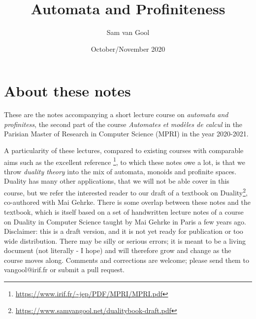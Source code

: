 
\title{Automata and Profiniteness}
\author{Sam van Gool}
\date{October/November 2020}
\maketitle

\section*{About these notes}
These are the notes accompanying a short lecture course on \emph{automata and profinitess}, the second part of the course \emph{Automates et mod\`eles de calcul} in the Parisian Master of Research in Computer Science (MPRI) in the year 2020-2021.


A particularity of these lectures, compared to existing courses with comparable aims such as the excellent reference \cite{JEP-MPRI}\footnote{\url{https://www.irif.fr/~jep/PDF/MPRI/MPRI.pdf}}, to which these notes owe a lot, is that we throw \emph{duality theory} into the mix of automata, monoids and profinite spaces. %
Duality has many other applications, that we will not be able cover in this course, but we refer the interested reader to our draft \cite{thebook} of a textbook on Duality\footnote{\url{https://www.samvangool.net/dualitybook-draft.pdf}}, co-authored with Mai Gehrke.
There is some overlap between these notes and the textbook, which is itself  based on a set of handwritten lecture notes of a course on Duality in Computer Science taught by Mai Gehrke in Paris a few years ago.\\


Disclaimer: this is a draft version, and it is not yet ready for publication or too wide distribution. There may be silly or serious errors; it is meant to be a living document (not literally - I hope) and will therefore grow and change as the course moves along. Comments and corrections are welcome; please send them to vangool@irif.fr or submit a pull request.

